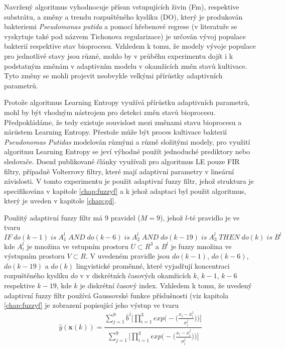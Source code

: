 \documentclass[11pt,twoside,openright]{report}
\begin{document}
\begin{appendices}
\begin{enumerate}
\end{enumerate}
Navržený algoritmus vyhodnocuje přísun vstupujících živin (Fm), respektive substrátu, a změny a trendu rozpuštěného kyslíku (DO), který je produkován bakteriemi \textit{Pseudomonas putida} a pomocí hřebenové regrese (v literatuře se vyskytuje také pod názvem Tichonova regularizace) je určován vývoj populace bakterií respektive stav bioprocesu. Vzhledem k tomu, že modely vývoje populace pro jednotlivé stavy jsou různé, mohlo by v průběhu experimentu dojít i k podstatným změnám v adaptivním modelu v okamžicích změn stavů kultivace. Tyto změny se mohli projevit neobvykle velkými přírůstky adaptivních parametrů. 
\par
Protože algoritmus Learning Entropy využívá přírůstku adaptivních parametrů, mohl by být vhodným nástrojem pro detekci změn stavů bioprocesu. Předpokládáme, že tedy existuje souvislost mezi změnami stavu bioprocesu a nárůstem Learning Entropy. Přestože může být proces kultivace bakterií \textit{Pseudonomas Putidas} modelován různými a různě složitými modely, pro využití algoritmu Learning Entropy se jeví výhodné použít jednoduché prediktory nebo sledovače. Dosud publikované články využívali pro algoritmus LE pouze FIR filtry, případně Volterrovy filtry, které mají adaptivní parametry v lineární závislosti. V tomto experimentu je použit adaptivní fuzzy filtr, jehož struktura je specifikována v kapitole \ref{chap:fuzzyf} a k jehož adaptaci byl použit algoritmus, který je uveden v kapitole \ref{chap:gd}.
\par
Použitý adaptivní fuzzy filtr má 9 pravidel ($M=9$), jehož $l$-té pravidlo je ve tvaru
\begin{equation}
    IF\;do(k-1)\; is\; A_1^l\;AND\;do(k-6)\;is\;A_2^l\;AND\;do(k-19)\;is\;A_3^l\;THEN\;do(k)\;is\;B^l
\end{equation}
kde $A_i^l$ je množina ve vstupním prostoru $U \subset R^3$ a $B^l$ je fuzzy množina ve výstupním prostoru $V \subset R$. V uvedeném pravidle jsou $do(k-1)$, $do(k-6)$, $do(k-19)$ a $do(k)$ lingvistické proměnné, které vyjadřují koncentraci rozpuštěného kyslíku $do$ v v diskrétních časových okamžicích $k$, $k-1$, $k-6$ respektive $k-19$, kde $k$ je diskrétní časový index. Vzhledem k tomu, že uvedený adaptivní fuzzy filtr používá Gaussovské funkce příslušnosti (viz kapitola \ref{chap:fuzzyf} je zobrazení popisující jeho výstup ve tvaru
\begin{equation}
    \hat{y}(\textbf{x}(k))=\frac{\sum_{j=1}^9 \overline{b}^j\Big[\prod_{i=1}^3 exp\Big(-\Big(\frac{x_i-\overline{x}_i^j}{\sigma_i^j}\Big)\Big)\Big]}{\sum_{j=1}^9 \Big[\prod_{i=1}^3 exp\Big(-\Big(\frac{x_i-\overline{x}_i^j}{\sigma_i^j}\Big)\Big)\Big]}

\end{equation}
\end{appendices}
\end{document}
